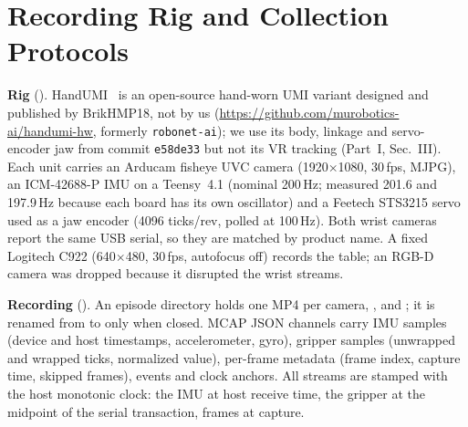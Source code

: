 \documentclass[conference,10pt]{IEEEtran}
\begin{document}
\section{Recording Rig and Collection Protocols}\label{m:sec:rig}
\textbf{Rig} (). HandUMI~\cite{handumi_hw} is an open-source hand-worn
UMI variant designed and published by BrikHMP18, not by us (\url{https://github.com/murobotics-ai/handumi-hw}, formerly
\texttt{robonet-ai}); we use its body, linkage and
servo-encoder jaw from commit \texttt{e58de33} but not its VR tracking (Part~I, Sec.~III). Each unit carries an Arducam fisheye UVC
camera (1920$\times$1080, 30\,fps, MJPG), an ICM-42688-P IMU on a Teensy~4.1 (nominal 200\,Hz; measured 201.6 and 197.9\,Hz
because each board has its own oscillator) and a Feetech STS3215 servo used as a jaw encoder (4096 ticks/rev, polled at
100\,Hz). Both wrist cameras report the same USB serial, so they are matched by product name. A fixed Logitech C922
(640$\times$480, 30\,fps, autofocus off) records the table; an RGB-D camera was dropped because it disrupted the wrist streams.

\textbf{Recording} (). An episode directory holds one MP4 per camera, ,
 and ; it is renamed from  to  only when closed.
MCAP JSON channels carry IMU samples (device and host timestamps, accelerometer, gyro), gripper samples (unwrapped and wrapped
ticks, normalized value), per-frame metadata (frame index, capture time, skipped frames), events and clock anchors. All streams
are stamped with the host monotonic clock: the IMU at host receive time, the gripper at the midpoint of the serial
transaction, frames at capture.
\end{document}
